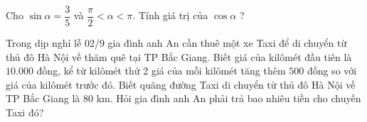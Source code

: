 \setcounter{bt}{0}
 \begin{bt}%
Cho $\sin \alpha=\dfrac{3}{5}$ và $\dfrac{\pi}{2}<\alpha<\pi$. Tính giá trị của $\cos \alpha$ ?
 \end{bt}
\begin{bt}%
Trong dịp nghỉ lễ 02/9 gia đình anh An cần thuê một xe Taxi để di chuyển từ thủ đô Hà Nội về thăm quê tại TP Bắc Giang. Biết giá của kilômét đầu tiên là $10.000$ đồng, kể từ kilômét thứ 2 giá của mỗi kilômét tăng thêm $500$ đồng so với giá của kilômét trước đó. Biết quãng đường Taxi di chuyển từ thủ đô Hà Nội về TP Bắc Giang là $80$ km. Hỏi gia đình anh An phải trả bao nhiêu tiền cho chuyến Taxi đó?
\end{bt}
